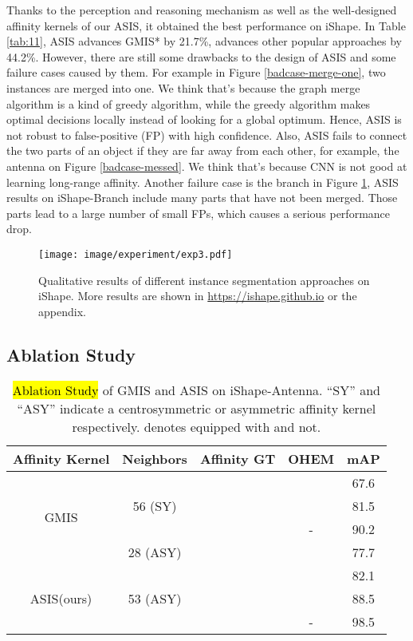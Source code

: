 Thanks to the perception and reasoning mechanism as well as the well-designed affinity kernels of our ASIS, it obtained the best performance on iShape. In Table \ref{tab:11}, ASIS advances GMIS* \cite{liu2018affinity} by 21.7\%, advances other popular approaches by 44.2\%. However, there are still some drawbacks to the design of ASIS and some failure cases caused by them. For example in Figure \ref{badcase-merge-one}, two instances are merged into one. We think that's because the graph merge algorithm is a kind of greedy algorithm, while the greedy algorithm makes optimal decisions locally instead of looking for a global optimum. Hence, ASIS is not robust to false-positive (FP) with high confidence. Also, ASIS fails to connect the two parts of an object if they are far away from each other, for example, the antenna on Figure \ref{badcase-messed}. We think that's because CNN is not good at learning long-range affinity. Another failure case is the branch in Figure \ref{fig:result}, ASIS results on iShape-Branch include many parts that have not been merged. Those parts lead to a large number of small FPs, which causes a serious performance drop.

\begin{figure}[h]
    \centering
    \texttt{[image: image/experiment/exp3.pdf]}
    \caption{Qualitative results of different instance segmentation approaches on iShape. More results are shown in \url{https://ishape.github.io} or the appendix.}
    \label{fig:result}
    \vspace{-1em}
\end{figure}

\subsection{Ablation Study}


\begin{table}[h]
\caption{\hl{Ablation Study} of GMIS and ASIS on iShape-Antenna. ``SY'' and ``ASY'' indicate a centrosymmetric or asymmetric affinity kernel respectively.  denotes equipped with and  not.}
    \centering
    \begin{tabular}{c|c|c|c|c}
    \toprule[1.5pt]
         
         
        Affinity Kernel & Neighbors & Affinity GT & OHEM & mAP \\
        \hline
        \multirow{4}{*}{GMIS \cite{liu2018affinity}} & \multirow{3}{*}{56 (SY)} &  &  & 67.6\\ \cline{3-5}
         & &  &  & 81.5 \\ \cline{3-5}
         & &  &  - & 90.2 \\ 
        \cline{2-5}
         & 28 (ASY) &  &  & 77.7 \\
        \hline
        \multirow{3}{*}{ASIS(ours)} & \multirow{3}{*}{53 (ASY)} &  &  & 82.1\\
        \cline{3-5}
         & &  &  & 88.5 \\ \cline{3-5}
         & &  & - & 98.5 \\ 
    \bottomrule[1.5pt]
    \end{tabular}
    \label{tab:ablation}
\end{table}


